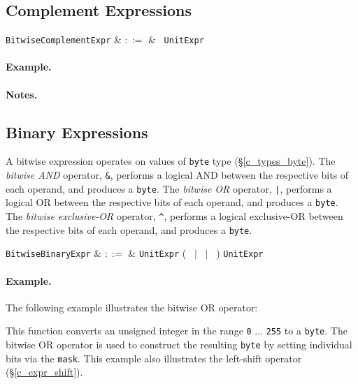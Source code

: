\subsection{Complement Expressions}
\label{c_expr_bitwise_complement}

\begin{syntax}
\verb+BitwiseComplementExpr+ & $::=$ & \token{~}\ \verb+UnitExpr+\\
\end{syntax}

\paragraph{Example.}

\paragraph{Notes.}

\subsection{Binary Expressions}
\label{c_expr_bitwise_binary}
A bitwise expression operates on values of \lstinline{byte} type (\S\ref{c_types_byte}).  The {\em bitwise AND} operator, \lstinline{&}, performs a logical AND between the respective bits of each operand, and produces a \lstinline{byte}.   The {\em bitwise OR} operator, \lstinline{|}, performs a logical OR between the respective bits of each operand, and produces a \lstinline{byte}.  The {\em bitwise exclusive-OR} operator, \lstinline{^}, performs a logical exclusive-OR between the respective bits of each operand, and produces a \lstinline{byte}.

\begin{syntax}
  \verb+BitwiseBinaryExpr+ & $::=$ & \verb+UnitExpr+ \big(\ \token{\&} $|$ \token{|}\ $|$ \token{\^}\ \big) \verb+UnitExpr+\\
\end{syntax}

\paragraph{Example.}  The following example illustrates the bitwise OR operator:



This function converts an unsigned integer in the range \lstinline{0} ... \lstinline{255} to a \lstinline{byte}.  The bitwise OR operator is used to construct the resulting \lstinline{byte} by setting individual bits via the \lstinline{mask}.  This example also illustrates the left-shift operator (\S\ref{c_expr_shift}).

